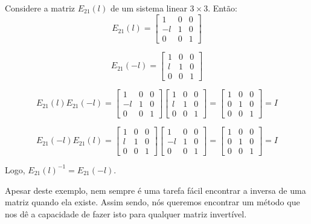 \begin{Example}
	Considere a matriz $E_{21}(l)$ de um sistema linear $3\times 3$. Então:
	$$
	E_{21}(l) = \begin{bmatrix}
		1 & 0 & 0 \\
		-l & 1 & 0 \\
		0 & 0 & 1
	\end{bmatrix}
	$$
	
	$$
	E_{21}(-l) = \begin{bmatrix}
		1 & 0 & 0 \\
		l & 1 & 0 \\
		0 & 0 & 1
	\end{bmatrix}
	$$
	
	$$
	E_{21}(l)E_{21}(-l) = \begin{bmatrix}
		1 & 0 & 0 \\
		-l & 1 & 0 \\
		0 & 0 & 1
	\end{bmatrix}
	\begin{bmatrix}
		1 & 0 & 0 \\
		l & 1 & 0 \\
		0 & 0 & 1
	\end{bmatrix} = 
	\begin{bmatrix}
		1 & 0 & 0 \\
		0 & 1 & 0 \\
		0 & 0 & 1
	\end{bmatrix} = I
	$$
	
	$$
	E_{21}(-l)E_{21}(l) = 	\begin{bmatrix}
		1 & 0 & 0 \\
		l & 1 & 0 \\
		0 & 0 & 1
	\end{bmatrix}
	\begin{bmatrix}
		1 & 0 & 0 \\
		-l & 1 & 0 \\
		0 & 0 & 1
	\end{bmatrix} = 
	\begin{bmatrix}
		1 & 0 & 0 \\
		0 & 1 & 0 \\
		0 & 0 & 1
	\end{bmatrix} = I
	$$
	
	Logo, $E_{21}(l)^{-1} = E_{21}(-l)$.
\end{Example}

Apesar deste exemplo, nem sempre é uma tarefa fácil encontrar a inversa de uma matriz quando ela existe. Assim sendo, nós queremos encontrar um método que nos dê a capacidade de fazer isto para qualquer matriz invertível.

